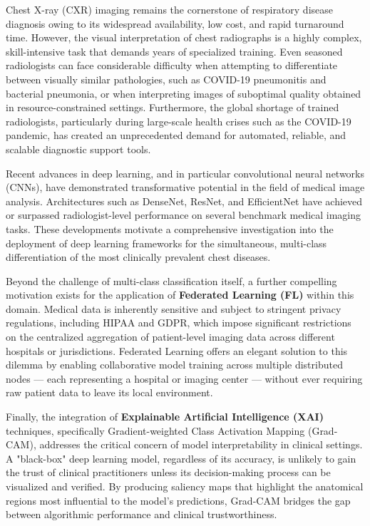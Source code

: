 Chest X-ray (CXR) imaging remains the cornerstone of respiratory disease diagnosis owing to its widespread availability, low cost, and rapid turnaround time. However, the visual interpretation of chest radiographs is a highly complex, skill-intensive task that demands years of specialized training. Even seasoned radiologists can face considerable difficulty when attempting to differentiate between visually similar pathologies, such as COVID-19 pneumonitis and bacterial pneumonia, or when interpreting images of suboptimal quality obtained in resource-constrained settings. Furthermore, the global shortage of trained radiologists, particularly during large-scale health crises such as the COVID-19 pandemic, has created an unprecedented demand for automated, reliable, and scalable diagnostic support tools.

Recent advances in deep learning, and in particular convolutional neural networks (CNNs), have demonstrated transformative potential in the field of medical image analysis. Architectures such as DenseNet, ResNet, and EfficientNet have achieved or surpassed radiologist-level performance on several benchmark medical imaging tasks. These developments motivate a comprehensive investigation into the deployment of deep learning frameworks for the simultaneous, multi-class differentiation of the most clinically prevalent chest diseases.

Beyond the challenge of multi-class classification itself, a further compelling motivation exists for the application of \textbf{Federated Learning (FL)} within this domain. Medical data is inherently sensitive and subject to stringent privacy regulations, including HIPAA and GDPR, which impose significant restrictions on the centralized aggregation of patient-level imaging data across different hospitals or jurisdictions. Federated Learning offers an elegant solution to this dilemma by enabling collaborative model training across multiple distributed nodes — each representing a hospital or imaging center — without ever requiring raw patient data to leave its local environment.

Finally, the integration of \textbf{Explainable Artificial Intelligence (XAI)} techniques, specifically Gradient-weighted Class Activation Mapping (Grad-CAM), addresses the critical concern of model interpretability in clinical settings. A "black-box" deep learning model, regardless of its accuracy, is unlikely to gain the trust of clinical practitioners unless its decision-making process can be visualized and verified. By producing saliency maps that highlight the anatomical regions most influential to the model's predictions, Grad-CAM bridges the gap between algorithmic performance and clinical trustworthiness.

